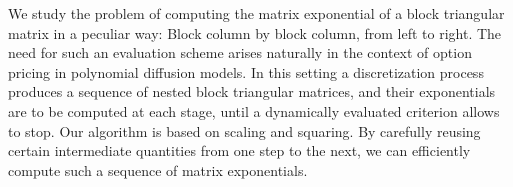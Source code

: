 We study the problem of computing the matrix exponential of a block
triangular matrix in a peculiar way: Block column by block column,
from left to right.  The need for such an evaluation scheme arises
naturally in the context of option pricing in polynomial diffusion
models.  In this setting a discretization process produces a sequence
of nested block triangular matrices, and their exponentials are to be
computed at each stage, until a dynamically evaluated criterion allows
to stop.  Our algorithm is based on scaling and squaring.  By
carefully reusing certain intermediate quantities from one step to the
next, we can efficiently compute such
a sequence of matrix exponentials.
